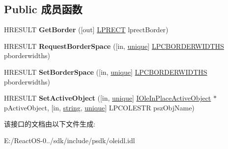 \subsection*{Public 成员函数}
\begin{DoxyCompactItemize}
\item 
\mbox{\label{interface_i_ole_in_place_u_i_window_ae05a32865d57363e68ff88f106f5579b}} 
H\+R\+E\+S\+U\+LT {\bfseries Get\+Border} (\mbox{[}out\mbox{]} \hyperlink{structtag_r_e_c_t}{L\+P\+R\+E\+CT} lprect\+Border)
\item 
\mbox{\label{interface_i_ole_in_place_u_i_window_aa8f4454fd75e34550f9bd517d7557133}} 
H\+R\+E\+S\+U\+LT {\bfseries Request\+Border\+Space} (\mbox{[}in, \hyperlink{interfaceunique}{unique}\mbox{]} \hyperlink{structtag_r_e_c_t}{L\+P\+C\+B\+O\+R\+D\+E\+R\+W\+I\+D\+T\+HS} pborderwidths)
\item 
\mbox{\label{interface_i_ole_in_place_u_i_window_a89b4650b7ae6d00d15a1b2cd15f8580d}} 
H\+R\+E\+S\+U\+LT {\bfseries Set\+Border\+Space} (\mbox{[}in, \hyperlink{interfaceunique}{unique}\mbox{]} \hyperlink{structtag_r_e_c_t}{L\+P\+C\+B\+O\+R\+D\+E\+R\+W\+I\+D\+T\+HS} pborderwidths)
\item 
\mbox{\label{interface_i_ole_in_place_u_i_window_a1c69e6cbab7f79fc97515c61dfa56899}} 
H\+R\+E\+S\+U\+LT {\bfseries Set\+Active\+Object} (\mbox{[}in, \hyperlink{interfaceunique}{unique}\mbox{]} \hyperlink{interface_i_ole_in_place_active_object}{I\+Ole\+In\+Place\+Active\+Object} $\ast$p\+Active\+Object, \mbox{[}in, \hyperlink{structstring}{string}, \hyperlink{interfaceunique}{unique}\mbox{]} L\+P\+C\+O\+L\+E\+S\+TR psz\+Obj\+Name)
\end{DoxyCompactItemize}


该接口的文档由以下文件生成\+:\begin{DoxyCompactItemize}
\item 
E\+:/\+React\+O\+S-\/0../sdk/include/psdk/oleidl.\+idl\end{DoxyCompactItemize}
